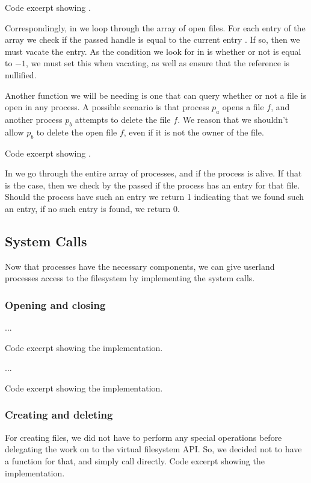 {Code excerpt showing .}

Correspondingly, in  we loop through the
array of open files. For each entry of the array we check if the passed handle
is equal to the current entry . If so, then we must vacate
the entry. As the condition we look for in  is
whether or not  is equal to $-1$, we must set this when
vacating, as well as ensure that the  reference is nullified.

\newpage
Another function we will be needing is one that can query whether or not a
file is open in any process. A possible scenario is that process $p_a$ opens a
file $f$, and another process $p_b$ attempts to delete the file $f$. We reason
that we shouldn't allow $p_b$ to delete the open file $f$, even if it is not
the owner of the file.

{Code excerpt showing .}

In  we go through the entire array of processes,
and if the process is alive. If that is the case, then we check by the passed
 if the process has an entry for that file. Should the process
have such an entry we return 1 indicating that we found such an entry, if no
such entry is found, we return 0.

\subsection{System Calls}
Now that processes have the necessary components, we can give userland
processes access to the filesystem by implementing the system calls.

\subsubsection{Opening and closing}
...

{Code excerpt showing the  implementation.}

...

{Code excerpt showing the  implementation.}

\subsubsection{Creating and deleting}
For creating files, we did not have to perform any special operations before
delegating the work on to the virtual filesystem API. So, we decided not to
have a function for that, and simply call  directly.
{Code excerpt showing the  implementation.}

